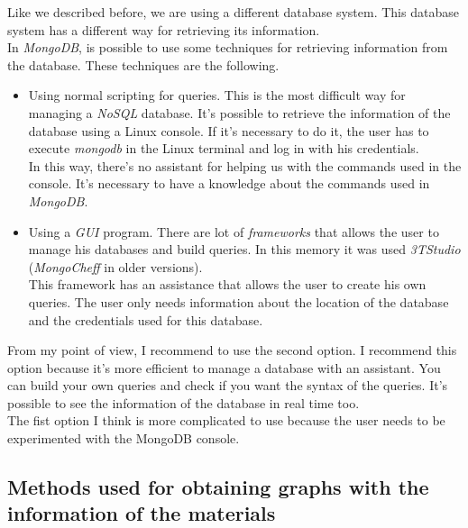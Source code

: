 Like we described before, we are using a different database system. This database system has a different way for retrieving its information.\\

In \textit{MongoDB}, is possible to use some techniques for retrieving information from the database. These techniques are the following.

\begin{itemize}

\item Using normal scripting for queries. This is the most difficult way for managing a \textit{NoSQL} database. It's possible to retrieve the information of the database using a Linux console. If it's necessary to do it, the user has to execute \textit{mongodb} in the Linux terminal and log in with his credentials.\\

In this way, there's no assistant for helping us with the commands used in the console. It's necessary to have a knowledge about the commands used in \textit{MongoDB}.

\item Using a \textit{GUI} program. There are lot of \textit{frameworks} that allows the user to manage his databases and build queries. In this memory it was used \textit{3TStudio} (\textit{MongoCheff} in older versions).\\

This framework has an assistance that allows the user to create his own queries. The user only needs information about the location of the database and the credentials used for this database.

\end{itemize}

From my point of view, I recommend to use the second option. I recommend this option because it's more efficient to manage a database with an assistant. You can build your own queries and check if you want the syntax of the queries. It's possible to see the information of the database in real time too.\\

The fist option I think is more complicated to use because the user needs to be experimented with the MongoDB console.

\subsection{Methods used for obtaining graphs with the information of the materials}

